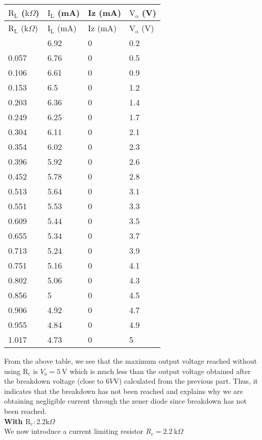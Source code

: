 \documentclass{scrartcl}
\begin{document}
\begin{longtable}{|l|l|l|l|}
\hline
$\mathrm{R_L}$ ($\mathrm{k}\Omega$) & $\mathrm{I_L}$ (mA) & Iz (mA) & $\mathrm{V_o}$ (V) \\ \hline
\endfirsthead
\hline
$\mathrm{R_L}$ ($\mathrm{k}\Omega$) & $\mathrm{I_L}$ (mA) & Iz (mA) & $\mathrm{V_o}$ (V) \\ \hline
\endhead
\hline
\endfoot
\hline
\endlastfoot
0.007       & 6.92      & 0       & 0.2       \\ \hline
0.057       & 6.76      & 0       & 0.5       \\ \hline
0.106       & 6.61      & 0       & 0.9       \\ \hline
0.153       & 6.5       & 0       & 1.2       \\ \hline
0.203       & 6.36      & 0       & 1.4       \\ \hline
0.249       & 6.25      & 0       & 1.7       \\ \hline
0.304       & 6.11      & 0       & 2.1       \\ \hline
0.354       & 6.02      & 0       & 2.3       \\ \hline
0.396       & 5.92      & 0       & 2.6       \\ \hline
0.452       & 5.78      & 0       & 2.8       \\ \hline
0.513       & 5.64      & 0       & 3.1       \\ \hline
0.551       & 5.53      & 0       & 3.3       \\ \hline
0.609       & 5.44      & 0       & 3.5       \\ \hline
0.655       & 5.34      & 0       & 3.7       \\ \hline
0.713       & 5.24      & 0       & 3.9       \\ \hline
0.751       & 5.16      & 0       & 4.1       \\ \hline
0.802       & 5.06      & 0       & 4.3       \\ \hline
0.856       & 5         & 0       & 4.5       \\ \hline
0.906       & 4.92      & 0       & 4.7       \\ \hline
0.955       & 4.84      & 0       & 4.9       \\ \hline
1.017       & 4.73      & 0       & 5         \\ \hline
\end{longtable}
\noindent
From the above table, we see that the maximum output voltage reached without using $\mathrm{R_c}$ is $V_o = 5 \ \mathrm{V}$ which is much less than the output voltage obtained after the breakdown voltage (close to $6V \mathrm{V}$) calculated from the previous part. Thus, it indicates that the breakdown has not been reached and explains why we are obtaining negligible current through the zener diode since breakdown has not been reached. \\[0.3cm]
\textbf{With $\mathrm{R_c}: 2.2 \mathrm{k}\Omega$ }\\[0.3cm]
We now introduce a current limiting resistor $R_c = 2.2 \ \mathrm{k}\Omega$
\end{document}
